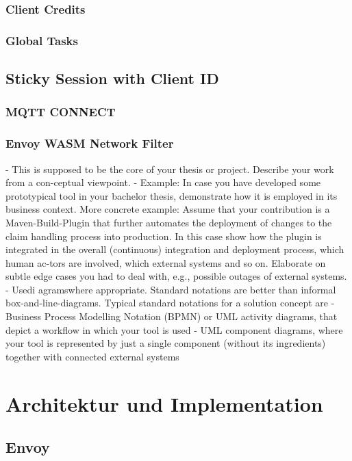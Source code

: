 \subsubsection{Client Credits}
\subsubsection{Global Tasks}

\subsection{Sticky Session with Client ID}
\subsubsection{MQTT CONNECT}
\subsubsection{Envoy WASM Network Filter}

- This is supposed to be the core of your thesis or project. Describe your work from a con-ceptual viewpoint.
- Example: In case you have developed some prototypical tool in your bachelor thesis, demonstrate how it is employed in its business context. More concrete example: Assume that your contribution is a Maven-Build-Plugin that further automates the deployment of changes to the claim handling process into production. In this case show how the plugin is integrated in the overall (continuous) integration and deployment process, which human ac-tors are involved, which external systems and so on. Elaborate on subtle edge cases you had to deal with, e.g., possible outages of external systems.
- Usedi  agramswhere appropriate. Standard notations are better than informal box-and-line-diagrams. Typical standard notations for a solution concept are
  - Business Process Modelling Notation (BPMN) or UML activity diagrams, that depict a workflow in which your tool is used
  - UML component diagrams, where your tool is represented by just a single component (without its ingredients) together with connected external systems

\section{Architektur und Implementation}

\subsection{Envoy}
